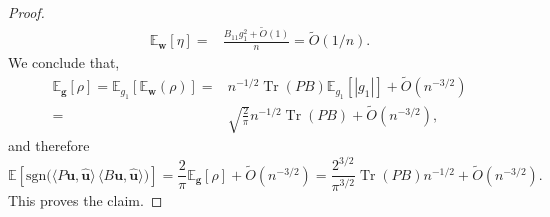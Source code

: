 \documentclass[reqno]{amsart}
\numberwithin{equation}{section}
\newcommand\E{\mathbb{E}}
\newcommand\bg{\bm{g}}
\newcommand\bw{\bm{w}}
\newcommand\rem{\tilde{O}\left(n^{-3/2}\right)}
\newcommand\bu{\bm{u}}
\newcommand\hu{\hat{\bm u}}
\newcommand\Tr{{\operatorname{Tr}}}
\begin{document}
\begin{proof}
\begin{align*}
\E_{\bw}[\eta]=& \frac{B_{11}g_{1}^2+\tilde{O}(1)}{n}=\tilde{O}(1/n).
\end{align*}
We conclude that,
\begin{align*}
\E_{\bg}[\rho]=\E_{g_{1}}\left[\E_{\bw}(\rho)\right]= & n^{-1/2}\Tr(PB)\E_{g_{1}}\left[|g_{1}|\right]+\rem\\ = & \sqrt{\frac{2}{\pi}}n^{-1/2}\Tr(PB)+\rem,  
\end{align*}
and therefore
\begin{equation*}
 \E\!\left[\mathrm{sgn}\!\big(\langle P\bu,\hu\rangle\,
\langle B\bu,\hu\rangle\big)\right]
=  \frac{2}{\pi}\E_{\bg}[\rho]+\rem
= \frac{2^{3/2}}{\pi^{3/2}}\Tr(PB)n^{-1/2}+\rem. 
\end{equation*}
This proves the claim.
\end{proof}
\fi
\end{document}

